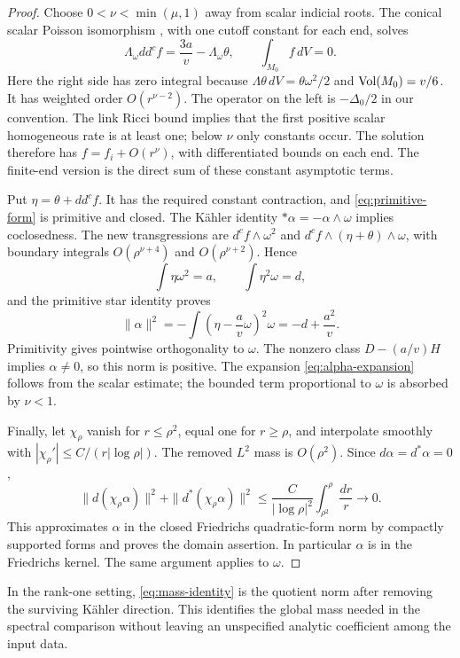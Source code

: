 \begin{proof}
Choose $0<\nu<\min(\mu,1)$ away from scalar indicial roots. The conical
scalar Poisson isomorphism \cite[Proposition~3.4]{benabida}, with one
cutoff constant for each end, solves
\begin{equation}\label{eq:scalar-correction}
 \Lambda_\omega dd^cf=\frac{3a}{v}-\Lambda_\omega\theta,
 \qquad \int_{M_0}f\,dV=0.
\end{equation}
Here the right side has zero integral because
$\Lambda\theta\,dV=\theta\omega^2/2$ and $\operatorname{Vol}(M_0)=v/6$.
It has weighted order $O(r^{\nu-2})$. The operator on the left is
$-\Delta_0/2$ in our convention. The link Ricci bound implies that the
first positive scalar homogeneous rate is at least one; below $\nu$
only constants occur. The solution therefore has
$f=f_i+O(r^\nu)$, with differentiated bounds on each end. The finite-end
version is the direct sum of these constant asymptotic terms.

Put $\eta=\theta+dd^cf$. It has the required constant contraction,
and \eqref{eq:primitive-form} is primitive and closed. The K\"ahler
identity $*\alpha=-\alpha\wedge\omega$ implies coclosedness. The
new transgressions are $d^cf\wedge\omega^2$ and
$d^cf\wedge(\eta+\theta)\wedge\omega$, with boundary integrals
$O(\rho^{\nu+4})$ and $O(\rho^{\nu+2})$. Hence
\[
 \int\eta\omega^2=a,\qquad \int\eta^2\omega=d,
\]
and the primitive star identity proves
\[
 \|\alpha\|^2=-\int\left(\eta-\frac av\omega\right)^2\omega
 =-d+\frac{a^2}{v}.
\]
Primitivity gives pointwise orthogonality to $\omega$. The nonzero class $D-(a/v)H$ implies $\alpha\ne0$, so this norm is positive.
The expansion \eqref{eq:alpha-expansion} follows from the scalar estimate;
the bounded term proportional to $\omega$ is absorbed by $\nu<1$.

Finally, let $\chi_\rho$ vanish for $r\le\rho^2$, equal one for
$r\ge\rho$, and interpolate smoothly with
$|\chi_\rho'|\le C/(r|\log\rho|)$. The removed $L^2$ mass is
$O(\rho^2)$. Since $d\alpha=d^*\alpha=0$,
\[
 \|d(\chi_\rho\alpha)\|^2+
 \|d^*(\chi_\rho\alpha)\|^2
 \le\frac{C}{|\log\rho|^2}\int_{\rho^2}^{\rho}\frac{dr}{r}
 \longrightarrow0.
\]
This approximates $\alpha$ in the closed Friedrichs quadratic-form norm
by compactly supported forms and proves the domain assertion. In
particular $\alpha$ is in the Friedrichs kernel. The same argument
applies to $\omega$.
\end{proof}

In the rank-one setting, \eqref{eq:mass-identity} is the quotient norm
after removing the surviving K\"ahler direction. This identifies the global mass
needed in the spectral comparison without leaving an unspecified
analytic coefficient among the input data.

